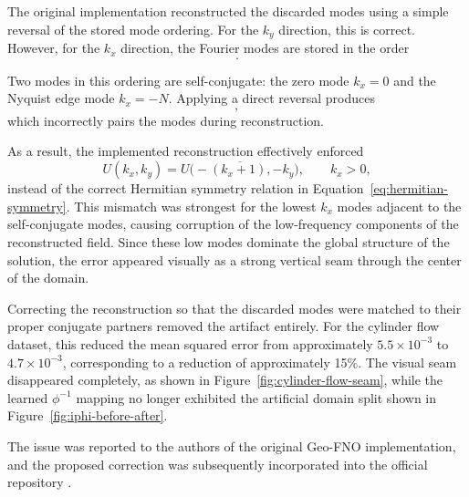 The original implementation reconstructed the discarded modes using a simple reversal of the stored mode ordering. For the $k_y$ direction, this is correct. However, for the $k_x$ direction, the Fourier modes are stored in the order
\begin{equation}
[0, 1, \dots, N-1, -N, -(N-1), \dots, -1].
\end{equation}

Two modes in this ordering are self-conjugate: the zero mode $k_x = 0$ and the Nyquist edge mode $k_x = -N$. Applying a direct reversal produces
\begin{equation}
[-1, -2, \dots, -N, N-1, N-2, \dots, 0],
\end{equation}
which incorrectly pairs the modes during reconstruction.

As a result, the implemented reconstruction effectively enforced
\begin{equation}
U(k_x, k_y)
=
\overline{U\bigl(-(k_x + 1), -k_y\bigr)},
\qquad k_x > 0,
\end{equation}
instead of the correct Hermitian symmetry relation in Equation~\ref{eq:hermitian-symmetry}. This mismatch was strongest for the lowest $k_x$ modes adjacent to the self-conjugate modes, causing corruption of the low-frequency components of the reconstructed field. Since these low modes dominate the global structure of the solution, the error appeared visually as a strong vertical seam through the center of the domain.

Correcting the reconstruction so that the discarded modes were matched to their proper conjugate partners removed the artifact entirely. For the cylinder flow dataset, this reduced the mean squared error from approximately $5.5 \times 10^{-3}$ to $4.7 \times 10^{-3}$, corresponding to a reduction of approximately 15\%. The visual seam disappeared completely, as shown in Figure~\ref{fig:cylinder-flow-seam}, while the learned $\phi^{-1}$ mapping no longer exhibited the artificial domain split shown in Figure~\ref{fig:iphi-before-after}.

The issue was reported to the authors of the original Geo-FNO implementation, and the proposed correction was subsequently incorporated into the official repository \cite{geo-fno-repo}.
